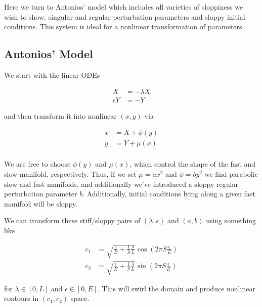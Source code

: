 \documentclass[11pt]{article}
\begin{document}
Here we turn to Antonios' model which includes all varieties of sloppiness we wish to show: singular and regular perturbation parameters and sloppy initial conditions. This system is ideal for a nonlinear transformation of parameters.

\subsection{Antonios' Model}

We start with the linear ODEs

\begin{align*}
  X &= -\lambda X \\
  \epsilon Y &= -Y
\end{align*}

and then transform it into nonlinear $(x, y)$ via 

\begin{align*}
  x &= X + \phi(y) \\
  y &= Y + \mu(x) \\
\end{align*}

We are free to choose $\phi(y)$ and $\mu(x)$, which control the shape of the fast and slow manifold, respectively. Thus, if we set $\mu = a x^2$ and $\phi = b y^2$ we find parabolic slow and fast manifolds, and additionally we've introduced a sloppy regular perturbation parameter $b$. Additionally, initial conditions lying along a given fast manifold will be sloppy.

We can transform these stiff/sloppy pairs of $(\lambda, \epsilon)$ and $(a, b)$ using something like

\begin{align*}
  c_1 &= \sqrt{\frac{\epsilon}{E} + \frac{1}{S}\frac{\lambda}{L}} \cos(2\pi S \frac{\epsilon}{E}) \\
  c_2 &= \sqrt{\frac{\epsilon}{E} + \frac{1}{S}\frac{\lambda}{L}} \sin(2\pi S \frac{\epsilon}{E})
\end{align*}

for $\lambda \in [0, L]$ and $\epsilon \in [0, E]$. This will swirl the domain and produce nonlinear contours in $(c_1, c_2)$ space.


% 
% 
\end{document}
